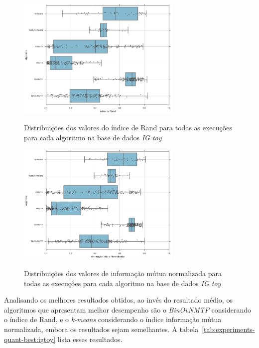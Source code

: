 \documentclass[
    12pt,                %
    oneside,            %
    a4paper,            %
    english,            %
    brazil                %
    ]{abntex2ppgsi}
\begin{document}
\begin{figure}[H]
    \centering
    \caption{Distribuições dos valores do índice de Rand para todas as execuções para cada algoritmo na base de dados \textit{IG toy}}
    \includegraphics[width=0.7\textwidth]{img/boxplot-all-rand-igtoy.png}
    \label{fig:boxplot-all-rand:igtoy}
\end{figure}

\begin{figure}[H]
    \centering
    \caption{Distribuições dos valores de informação mútua normalizada para todas as execuções para cada algoritmo na base de dados \textit{IG toy}}
    \includegraphics[width=0.7\textwidth]{img/boxplot-all-nmi-igtoy.png}
    \label{fig:boxplot-all-nmi:igtoy}
\end{figure}

Analisando os melhores resultados obtidos, ao invés do resultado médio, os algoritmos que apresentam melhor desempenho são o \textit{BinOvNMTF} considerando o índice de Rand, e o \textit{k-means} considerando o índice informação mútua normalizada, embora os resultados sejam semelhantes. A tabela~\ref{tab:experiments-quant-best:igtoy} lista esses resultados.
\end{document}
